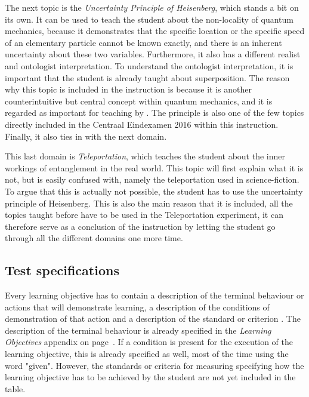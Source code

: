 \documentclass[11pt,twoside]{report} %
\begin{document}
The next topic is the \emph{Uncertainty Principle of Heisenberg}, which stands a bit on its own. It can be used to teach the student about the non-locality of quantum mechanics, because it demonstrates that the specific location or the specific speed of an elementary particle cannot be known exactly, and there is an inherent uncertainty about these two variables. Furthermore, it also has a different realist and ontologist interpretation. To understand the ontologist interpretation, it is important that the student is already taught about superposition. The reason why this topic is included in the instruction is because it is another counterintuitive but central concept within quantum mechanics, and it is regarded as important for teaching by . The principle is also one of the few topics directly included in the Centraal Eindexamen 2016 \cite{eindexamen2016} within this instruction. Finally, it also ties in with the next domain.

This last domain is \emph{Teleportation}, which teaches the student about the inner workings of entanglement in the real world. This topic will first explain what it is not, but is easily confused with, namely the teleportation used in science-fiction. To argue that this is actually not possible, the student has to use the uncertainty principle of Heisenberg. This is also the main reason that it is included, all the topics taught before have to be used in the Teleportation experiment, it can therefore  serve as a conclusion of the instruction by letting the student go through all the different domains one more time.

\subsection{Test specifications}

Every learning objective has to contain a description of the terminal behaviour or actions that will demonstrate learning, a description of the conditions of demonstration of that action and a description of the standard or criterion \cite{smithragan}. The description of the terminal behaviour is already specified in the \emph{Learning Objectives} appendix on page~\pageref{app:learningobjectives}. If a condition is present for the execution of the learning objective, this is already specified as well, most of the time using the word "given". However, the standards or criteria for measuring specifying how the learning objective has to be achieved by the student are not yet included in the table.
\end{document}

